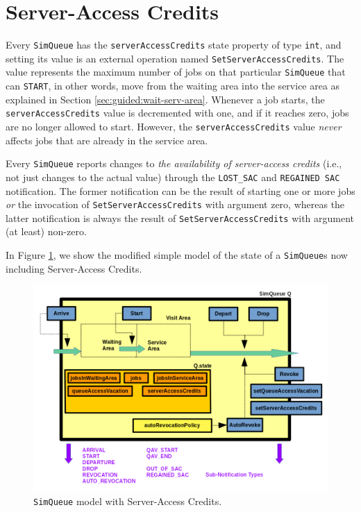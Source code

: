 \section{Server-Access Credits}
\label{sec:guided:sac}

Every \lstinline|SimQueue| has the
  \lstinline|serverAccessCredits|
  state property of type \lstinline|int|,
  and setting its value is an
  external operation
  named \lstinline|SetServerAccessCredits|.
The value represents the maximum number of
  jobs on that particular \lstinline|SimQueue|
  that can \lstinline|START|,
  in other words,
  move from the waiting area into
  the service area
  as explained in Section \ref{sec:guided:wait-serv-area}.
Whenever a job starts,
  the \lstinline|serverAccessCredits| value
  is decremented with one,
  and if it reaches zero,
  jobs are no longer allowed to start.
However,
  the \lstinline|serverAccessCredits| value
  {\em never\/}
  affects jobs that are already in the
  service area.

\begin{sloppypar}
Every \lstinline|SimQueue| reports
  changes to {\em the availability of server-access credits\/}
  (i.e., not just changes to the actual value)
  through the \lstinline|LOST_SAC|
  and \lstinline|REGAINED SAC|
  notification.
The former notification can be the result of
  starting one or more jobs
  {\em or\/}
  the invocation of \lstinline|SetServerAccessCredits|
  with argument zero,
  whereas the latter notification is always
  the result of \lstinline|SetServerAccessCredits|
  with argument (at least) non-zero.
\end{sloppypar}

In Figure \ref{fig:ServerAccessCredits},
  we show the modified simple model of the state of
  a \lstinline|SimQueue|s
  now including Server-Access Credits.

\begin{figure}[!htbp]
\label{fig:ServerAccessCredits}
\caption{\texttt{SimQueue} model with Server-Access Credits.}
\includegraphics[width=\textwidth]{fig/ServerAccessCredits}
\end{figure}

